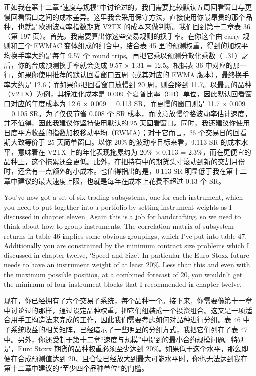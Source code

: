 \begin{chineseblock}正如我在第十二章“速度与规模”中讨论过的，我们需要比较默认五周回看窗口与更慢回看窗口之间的成本差异。这里我会采用保守方法，直接使用你最昂贵的那个品种，也就是欧洲波动率指数期货 V2TX 的成本来做判断。我们回到第十二章表 36（第 197 页）。首先，我需要算出你这些交易规则的换手率。在你这个由 carry 规则和三个 EWMAC 变体组成的组合中，结合表 45 里的预测权重，得到的加权平均换手率大约是每年 9.57 个 round trips。再把它乘以预测分散化乘数（1.31）之后，你的合成预测换手率就会变成 9.57 × 1.31 = 12.5。根据表 36 中对应的那一行，如果你使用推荐的默认回看窗口五周（或其对应的 EWMA 版本），最终换手率大约是 12.6；而如果你把回看窗口放慢到 20 周，则会降到 11.7。以最贵的品种（V2TX）为例，其标准化成本是 0.009 个夏普比率（SR）单位，因此默认回看窗口对应的年度成本为 12.6 × 0.009 = 0.113 SR，而更慢的窗口则是 11.7 × 0.009 = 0.105 SR。为了仅仅节省 0.008 个 SR 成本，而故意放慢价格波动率估计速度，并不值得，因此我建议你坚持使用默认的 25 天回看窗口。同时，我还建议你使用日度平方收益的指数加权移动平均（EWMA）；对于它而言，36 个交易日的回看期大致等价于 25 天简单窗口。以你 20\% 的波动率目标来看，0.113 SR 的成本水平，意味着在 V2TX 上的年化表现拖累约为 20\% × 0.113 = 2.3\%，而在更便宜的品种上，这个拖累还会更低。此外，在把持有中的期货头寸滚动到新的交割月份时，还会有一点额外的小成本。也值得指出的是，0.113 SR 明显低于我在第十二章中建议的最大速度上限，也就是每年在成本上花费不超过 0.13 个 SR。 \end{chineseblock}


\begin{englishblock} You've now got a set of six trading subsystems, one for each instrument, which you need to put together into a portfolio by setting instrument weights as I discussed in chapter eleven. Again this is a job for handcrafting, so we need to think about how to group instruments. The correlation matrix of subsystem returns in table 46 implies some obvious groupings, which I've put into table 47. Additionally you are constrained by the minimum contract size problems which I discussed in chapter twelve, ‘Speed and Size'. In particular the Euro Stoxx future needs to have an instrument weight of at least 20\%. Less than this and even with the maximum possible position, at a combined forecast of 20, you wouldn't get the minimum of four instrument blocks that I recommended in chapter twelve. \end{englishblock}

\begin{chineseblock}现在，你已经拥有了六个交易子系统，每个品种一个。接下来，你需要像第十一章中讨论过的那样，通过设定品种权重，把它们组装成一个投资组合。这又是一项适合用手工构造法来完成的工作，因此我们需要考虑如何对品种进行分组。表 46 中子系统收益的相关矩阵，已经暗示了一些明显的分组方式，我把它们列在了表 47 中。另外，你还受制于第十二章“速度与规模”中提到的最小合约规模问题。特别是，Euro Stoxx 期货的品种权重必须至少达到 20\%。如果低于这个水平，那么即便在合成预测值达到 20、且仓位已经放大到最大可能水平时，你也无法达到我在第十二章中建议的“至少四个品种单位”的门槛。\end{chineseblock}

